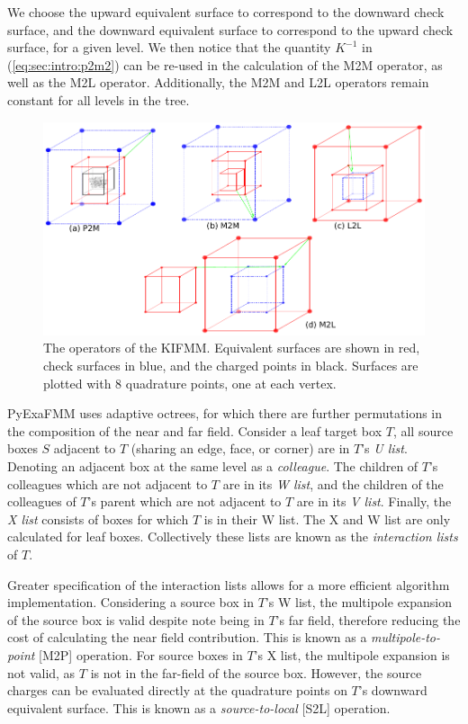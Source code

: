 \documentclass{IEEEcsmag}
\begin{document}
We choose the upward equivalent surface to correspond to the downward check surface, and the downward equivalent surface to correspond to the upward check surface, for a given level. We then notice that the quantity $K^{-1}$ in (\ref{eq:sec:intro:p2m2}) can be re-used in the calculation of the M2M operator, as well as the M2L operator. Additionally, the M2M and L2L operators remain constant for all levels in the tree.

\begin{figure}
	\centerline{\includegraphics {figures/operators.pdf}}
	\caption{The operators of the KIFMM. Equivalent surfaces are shown in red, check surfaces in blue, and the charged points in black. Surfaces are plotted with 8 quadrature points, one at each vertex.}
	\label{fig:operators}
\end{figure}

PyExaFMM uses adaptive octrees, for which there are further permutations in the composition of the near and far field. Consider a leaf target box $T$, all source boxes $S$ adjacent to $T$ (sharing an edge, face, or corner) are in $T$'s \textit{U list}. Denoting an adjacent box at the same level as a \textit{colleague}. The children of $T$'s colleagues which are not adjacent to $T$ are in its \textit{W list}, and the children of the colleagues of $T$'s parent which are not adjacent to $T$ are in its \textit{V list}. Finally, the \textit{X list} consists of boxes for which $T$ is in their W list. The X and W list are only calculated for leaf boxes. Collectively these lists are known as the \textit{interaction lists} of $T$.

Greater specification of the interaction lists allows for a more efficient algorithm implementation. Considering a source box in $T$'s W list, the multipole expansion of the source box is valid despite note being in $T$'s far field, therefore reducing the cost of calculating the near field contribution. This is known as a \textit{multipole-to-point} [M2P] operation. For source boxes in $T$'s X list, the multipole expansion is not valid, as $T$ is not in the far-field of the source box. However, the source charges can be evaluated directly at the quadrature points on $T$'s downward equivalent surface. This is known as a \textit{source-to-local} [S2L] operation.
\end{document}
